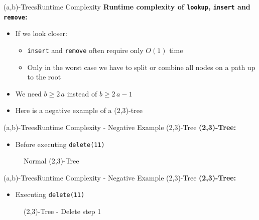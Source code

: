 \begin{frame}{(a,b)-Trees}{Runtime Complexity}
  \textbf{Runtime complexity of \texttt{\color{Mittel-Blau}lookup},
    \texttt{\color{Mittel-Blau}insert} and \texttt{\color{Mittel-Blau}remove}:}
  \begin{itemize}
    \item<2->
      If we look closer:
      \begin{itemize}
        \item<3->
          \texttt{\color{Mittel-Blau}insert} and
          \texttt{\color{Mittel-Blau}remove}
          often require only {\color{Mittel-Blau}$O(1)$} time
        \item<4->
          Only in the {\color{Mittel-Blau}worst case} we have to
          {\color{Mittel-Blau}split} or
          {\color{Mittel-Blau}combine} all nodes on a path up to the root
      \end{itemize}
    \item<5->
      We need {\color{Mittel-Blau}$b \geq 2 \, a$} instead of
      {\color{Mittel-Blau}$b \geq 2 \, a - 1$}
    \item<6->
      Here is a negative example of a (2,3)-tree
  \end{itemize}
\end{frame}


\begin{frame}{(a,b)-Trees}{Runtime Complexity - Negative Example (2,3)-Tree}
  \textbf{(2,3)-Tree:}
  \begin{itemize}
    \item<2->
      Before executing \texttt{\color{Mittel-Blau}delete(11)}
  \end{itemize}
  \begin{figure}
    \begin{adjustbox}{width=0.6\linewidth}
      
    \end{adjustbox}
    \label{fig:a_b_tree:2_3_tree_1}
    \caption{Normal (2,3)-Tree}
  \end{figure}
\end{frame}


\begin{frame}{(a,b)-Trees}{Runtime Complexity - Negative Example (2,3)-Tree}
  \textbf{(2,3)-Tree:}
  \begin{itemize}
  \item
    Executing \texttt{\color{Mittel-Blau}delete(11)}
  \end{itemize}
  \begin{figure}
    \begin{adjustbox}{width=0.6\linewidth}
      
    \end{adjustbox}
    \label{fig:a_b_tree:2_3_tree_2}
    \caption{(2,3)-Tree - Delete step 1}
  \end{figure}
\end{frame}

